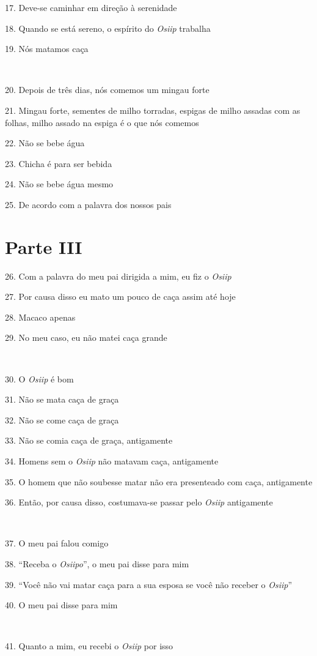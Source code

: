 17. Deve-se caminhar em direção à serenidade

18. Quando se está sereno, o espírito do \emph{Osiip} trabalha

19. Nós matamos caça

~

20. Depois de três dias, nós comemos um mingau forte

21. Mingau forte, sementes de milho torradas, espigas de milho assadas
com as folhas, milho assado na espiga é o que nós comemos

22. Não se bebe água

23. Chicha é para ser bebida

24. Não se bebe água mesmo

25. De acordo com a palavra dos nossos pais

\section{Parte III}

26. Com a palavra do meu pai dirigida a mim, eu fiz o \emph{Osiip}

27. Por causa disso eu mato um pouco de caça assim até hoje

28. Macaco apenas

29. No meu caso, eu não matei caça grande

~

30. O \emph{Osiip} é bom

31. Não se mata caça de graça

32. Não se come caça de graça

33. Não se comia caça de graça, antigamente

34. Homens sem o \emph{Osiip} não matavam caça, antigamente

35. O homem que não soubesse matar não era presenteado com caça,
antigamente

36. Então, por causa disso, costumava-se passar pelo \emph{Osiip}
antigamente

~

37. O meu pai falou comigo

38. ``Receba o \emph{Osiipo}'', o meu pai disse para mim

39. ``Você não vai matar caça para a sua esposa se você não receber o
\emph{Osiip}''

40. O meu pai disse para mim

~

41. Quanto a mim, eu recebi o \emph{Osiip} por isso

